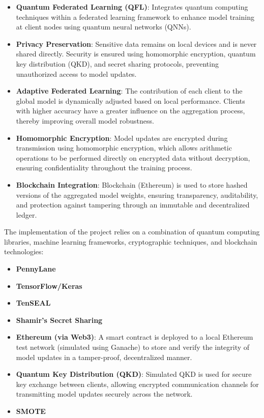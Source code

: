 \documentclass[10pt]{article}
\begin{document}
\begin{itemize}
	\item \textbf{Quantum Federated Learning (QFL)}: Integrates quantum computing techniques within a federated learning framework to enhance model training at client nodes using quantum neural networks (QNNs).
	\item \textbf{Privacy Preservation}: Sensitive data remains on local devices and is never shared directly. Security is ensured using homomorphic encryption, quantum key distribution (QKD), and secret sharing protocols, preventing unauthorized access to model updates.
	\item \textbf{Adaptive Federated Learning}: The contribution of each client to the global model is dynamically adjusted based on local performance. Clients with higher accuracy have a greater influence on the aggregation process, thereby improving overall model robustness.
	\item \textbf{Homomorphic Encryption}: Model updates are encrypted during transmission using homomorphic encryption, which allows arithmetic operations to be performed directly on encrypted data without decryption, ensuring confidentiality throughout the training process.
	\item \textbf{Blockchain Integration}: Blockchain (Ethereum) is used to store hashed versions of the aggregated model weights, ensuring transparency, auditability, and protection against tampering through an immutable and decentralized ledger.
\end{itemize}
The implementation of the project relies on a combination of quantum computing libraries, machine learning frameworks, cryptographic techniques, and blockchain technologies:
\begin{itemize}
	\item \textbf{PennyLane}
	\item \textbf{TensorFlow/Keras}
	\item \textbf{TenSEAL}
	\item \textbf{Shamir's Secret Sharing}
	\item \textbf{Ethereum (via Web3)}: A smart contract is deployed to a local Ethereum test network (simulated using Ganache) to store and verify the integrity of model updates in a tamper-proof, decentralized manner.
	\item \textbf{Quantum Key Distribution (QKD)}: Simulated QKD is used for secure key exchange between clients, allowing encrypted communication channels for transmitting model updates securely across the network.
	\item \textbf{SMOTE}
\end{itemize}
\end{document}
